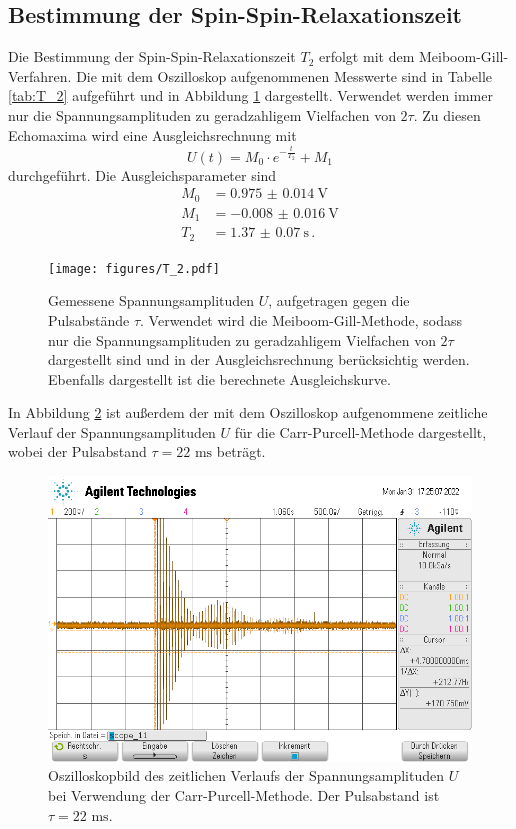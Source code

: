 \subsection*{Bestimmung der Spin-Spin-Relaxationszeit}
Die Bestimmung der Spin-Spin-Relaxationszeit $T_2$ erfolgt mit dem Meiboom-Gill-Verfahren. Die 
mit dem Oszilloskop aufgenommenen Messwerte sind in Tabelle \ref{tab:T_2} aufgeführt und in Abbildung
\ref{fig:T_2} dargestellt. Verwendet werden immer nur die Spannungsamplituden zu geradzahligem Vielfachen
von $2 \tau$. Zu diesen Echomaxima wird eine Ausgleichsrechnung mit 
\begin{equation*}
    U(t) = M_0 \cdot e^{-\frac{t}{T_2}} + M_1
\end{equation*}
durchgeführt. Die Ausgleichsparameter sind
\begin{align}
    M_0 &= \SI{0.975(14)}{\volt} \\
    M_1 &= \SI{-0.008(16)}{\volt} \\
    T_2 &= \SI{1.37(7)}{\second} \, .
    \label{eq:T_2}
\end{align}
\begin{figure}
    \centering
    \texttt{[image: figures/T\_2.pdf]}
    \caption{Gemessene Spannungsamplituden $U$, aufgetragen gegen die Pulsabstände $\tau$. Verwendet wird die 
            Meiboom-Gill-Methode, sodass nur die Spannungsamplituden zu geradzahligem Vielfachen
            von $2 \tau$ dargestellt sind und in der Ausgleichsrechnung berücksichtig werden. Ebenfalls dargestellt
            ist die berechnete Ausgleichskurve.}
    \label{fig:T_2}
\end{figure}
In Abbildung \ref{fig:Carr_Purcell} ist außerdem der mit dem Oszilloskop aufgenommene zeitliche Verlauf der 
Spannungsamplituden $U$ für die Carr-Purcell-Methode dargestellt, wobei der Pulsabstand $\tau = 22 \text{ ms}$
beträgt.
\begin{figure}
    \centering
    \includegraphics[width=0.9\linewidth]{Messwerte/Carr_Purcell.png}
    \caption{Oszilloskopbild des zeitlichen Verlaufs der Spannungsamplituden $U$ bei Verwendung der 
            Carr-Purcell-Methode. Der Pulsabstand ist $\tau = 22 \text{ ms}.$}
    \label{fig:Carr_Purcell}
\end{figure}

